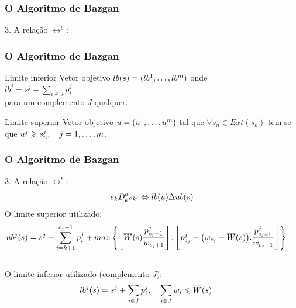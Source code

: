 \documentclass[10pt,xcolor=table,fleqn]{beamer}
\begin{document}
\begin{frame}
	\frametitle{O Algoritmo de Bazgan}
  \begin{block}{3. A relação $\rel^{b}$:}
    \vspace*{5cm}
  \end{block}
\end{frame}

\begin{frame}
	\frametitle{O Algoritmo de Bazgan}
  \begin{block}{Limite inferior}
    Vetor objetivo $lb(s) = (lb^1, \ldots, lb^m)$ onde \\
    \vspace*{2mm}
    \hspace*{4mm}
    $lb^j = s^j + \sum_{i \in J}{p_i^j}$
    \\
    \vspace{2mm}
    para um complemento $J$ qualquer.
  \end{block}
  \pause
  \vspace{5mm}
  \begin{block}{Limite superior}
    Vetor objetivo $u = (u^1, \ldots, u^m)$ tal que $\forall s_n \in Ext(s_k)$
    tem-se que $u^j \geqslant s_n^j, \quad j = 1, \ldots, m$.
  \end{block}
\end{frame}

\begin{frame}
	\frametitle{O Algoritmo de Bazgan}
  \begin{block}{3. A relação $\rel^{b}$:}
    \begin{displaymath}
      s_k D_k^{b} s_{{k'}}
        \Leftrightarrow
        lb(u) \Delta ub(s)
    \end{displaymath}
    \pause
    \vspace{6mm}
    O limite superior utilizado:
    \footnotesize
    \begin{equation*}
      \hspace{-5mm}
      ub^j(s) = s^j + \sum_{i=k+1}^{c_j-1} p_i^j +
        max\left\{ \left\lfloor\overline{W}(s)\frac{p^j_{c_j+1}}{w_{c_j+1}} \right\rfloor ,
         \left\lfloor p^j_{c_j} - \big(w_{c_j} - \overline{W}(s)\big).\frac{p^j_{c_{j-1}}}{w_{c_j-1}}
         \right\rfloor \right\}
    \end{equation*}
    \pause
    \\ \vspace{6mm}
    O limite inferior utilizado (complemento $J$):
    \footnotesize
    \begin{equation*}
      \hspace{-5mm}
      lb^j(s) = s^j + \sum_{i \in J}{p_i^j}, \quad
        \sum_{i \in J}{w_i} \leq \overline{W}(s)
    \end{equation*}
    \vspace{6mm}
  \end{block}
\end{frame}
\end{document}

